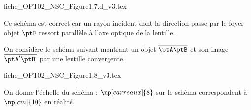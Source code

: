 


\begin{enonce}
\begin{center}
{fiche_OPT02_NSC_Figure1.7.d_v3.tex}
\end{center}
\end{enonce}


\begin{corrige}
Ce schéma est correct car un rayon incident dont la direction passe par le foyer objet $\ptF$ ressort parallèle à l'axe optique de la lentille.
\end{corrige}


\finEntrainement





\newpage




\hauteurLargeurCadreReponse		{8mm}{4cm}
\initialisationEntrainement

On considère le schéma suivant  montrant un objet $\overline{\ptA\ptB}$ et son image $\overline{\ptA'\ptB'}$ par une lentille convergente.
\begin{center}
{fiche_OPT02_NSC_Figure1.8_v3.tex}
\end{center}
On donne l'échelle du schéma : $\np[carreaux]{8}$ sur le schéma correspondent à $\np[cm]{10}$ en réalité.

